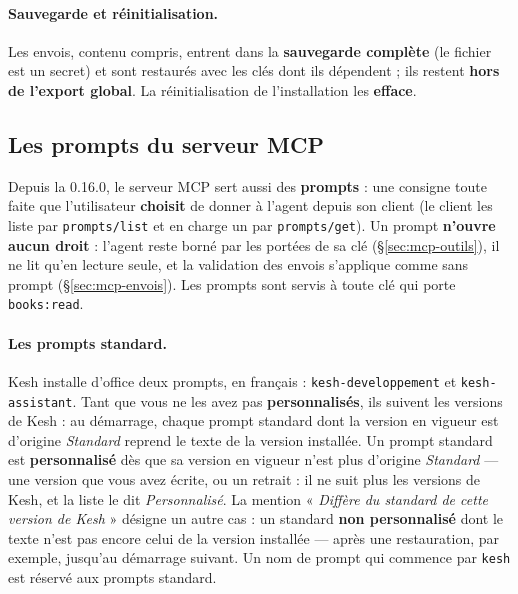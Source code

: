 \documentclass[a4paper,11pt,oneside]{article}
\begin{document}
\paragraph{Sauvegarde et réinitialisation.} Les envois, contenu compris, entrent dans la \textbf{sauvegarde complète} (le fichier  est un secret) et sont restaurés avec les clés dont ils dépendent ; ils restent \textbf{hors de l'export global}. La réinitialisation de l'installation les \textbf{efface}.

\subsection{Les prompts du serveur MCP}\label{sec:mcp-prompts}

Depuis la 0.16.0, le serveur MCP sert aussi des \textbf{prompts} : une consigne toute faite que l'utilisateur \textbf{choisit} de donner à l'agent depuis son client (le client les liste par \texttt{prompts/list} et en charge un par \texttt{prompts/get}). Un prompt \textbf{n'ouvre aucun droit} : l'agent reste borné par les portées de sa clé (\S\ref{sec:mcp-outils}), il ne lit qu'en lecture seule, et la validation des envois s'applique comme sans prompt (\S\ref{sec:mcp-envois}). Les prompts sont servis à toute clé qui porte \texttt{books:read}.

\paragraph{Les prompts standard.} Kesh installe d'office deux prompts, en français : \texttt{kesh-developpement} et \texttt{kesh-assistant}. Tant que vous ne les avez pas \textbf{personnalisés}, ils suivent les versions de Kesh : au démarrage, chaque prompt standard dont la version en vigueur est d'origine \emph{Standard} reprend le texte de la version installée. Un prompt standard est \textbf{personnalisé} dès que sa version en vigueur n'est plus d'origine \emph{Standard} --- une version que vous avez écrite, ou un retrait : il ne suit plus les versions de Kesh, et la liste le dit \emph{Personnalisé}. La mention « \emph{Diffère du standard de cette version de Kesh} » désigne un autre cas : un standard \textbf{non personnalisé} dont le texte n'est pas encore celui de la version installée --- après une restauration, par exemple, jusqu'au démarrage suivant. Un nom de prompt qui commence par \texttt{kesh} est réservé aux prompts standard.
\end{document}
